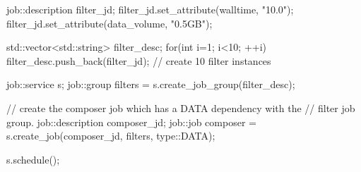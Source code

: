  \begin{mycode}[label=Describing Data Dependencies]
 
    job::description filter_jd;
    filter_jd.set_attribute(walltime, "10.0");
    filter_jd.set_attribute(data_volume, "0.5GB");
    
    std::vector<std::string> filter_desc;
    for(int i=1; i<10; ++i)
      filter_desc.push_back(filter_jd); // create 10 filter instances
    
    job::service s;
    job::group filters = s.create_job_group(filter_desc);

    // create the composer job which has a DATA dependency with the
    // filter job group. 
    job::description composer_jd;
    job::job composer = s.create_job(composer_jd, filters, type::DATA);
    
    s.schedule();
  
 \end{mycode}

